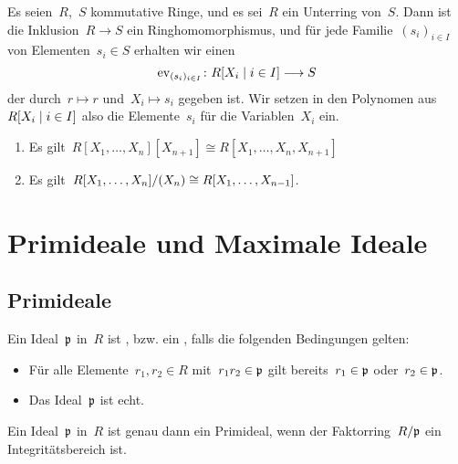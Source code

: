 \begin{example}
  Es seien~$R$,~$S$ kommutative Ringe, und es sei~$R$ ein Unterring von~$S$.
  Dann ist die Inklusion~$R \to S$ ein Ringhomomorphismus, und für jede Familie~$(s_i)_{i \in I}$ von Elementen~$s_i \in S$ erhalten wir einen 
  \[
    \ev_{(s_i)_{i \in I}}
    \colon
    R[X_i \suchthat i \in I]
    \to
    S
  \]
  der durch~$r \mapsto r$ und~$X_i \mapsto s_i$ gegeben ist.
  Wir setzen in den Polynomen aus~$R[X_i \suchthat i \in I]$ also die Elemente~$s_i$ für die Variablen~$X_i$ ein.
\end{example}

\begin{proposition}
  \leavevmode
  \begin{enumerate}
    \item
      Es gilt~$R[X_1, \dotsc, X_n][X_{n+1}] \cong R[X_1, \dotsc, X_n, X_{n+1}]$
    \item
      Es gilt~$R[X_1, \dotsc, X_n] / (X_n) \cong R[X_1, \dotsc, X_{n-1}]$.
  \end{enumerate}
\end{proposition}





\section{Primideale und Maximale Ideale}



\subsection{Primideale}

\begin{definition}
  Ein Ideal~$\mathfrak{p}$ in~$R$ ist , bzw. ein , falls die folgenden Bedingungen gelten:
  \begin{itemize}
    \item
      Für alle Elemente~$r_1, r_2 \in R$ mit~$r_1 r_2 \in \mathfrak{p}$ gilt bereits~$r_1 \in \mathfrak{p}$ oder~$r_2 \in \mathfrak{p}$.
    \item
      Das Ideal~$\mathfrak{p}$ ist echt.
  \end{itemize}
\end{definition}

\begin{proposition}
  Ein Ideal~$\mathfrak{p}$ in~$R$ ist genau dann ein Primideal, wenn der Faktorring~$R/\mathfrak{p}$ ein Integritätsbereich ist.
\end{proposition}




